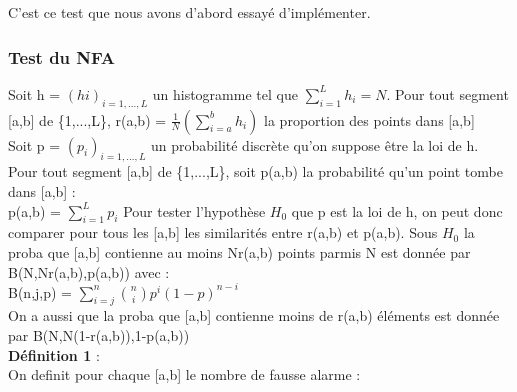 \documentclass{article}
\begin{document}
{C'est ce test que nous avons d'abord essayé d'implémenter. 
\subsubsection{Test du NFA}
Soit h = $ (hi)_{i=1,...,L}$ un histogramme tel que $\sum_{i=1}^{L}h_i = N.$
Pour tout segment [a,b] de \{1,...,L\}, 
r(a,b) = $\frac{1}{N}(\sum_{i=a}^{b}h_i) $ la proportion des points dans [a,b]\\
Soit p = $(p_i)_{i=1,...,L}$ un probabilité discrète qu'on suppose être la loi de h. \\
Pour tout segment [a,b] de \{1,...,L\}, soit p(a,b) la probabilité qu'un point tombe dans [a,b] : \\
p(a,b) = $\sum_{i=1}^{L}p_i $
Pour tester l'hypothèse $H_0$ que p est la loi de h, on peut donc comparer pour tous les [a,b] les similarités entre r(a,b) et p(a,b). 
Sous $H_0$ la proba que [a,b] contienne au moins Nr(a,b) points parmis N est donnée par B(N,Nr(a,b),p(a,b)) avec : \\
B(n,j,p) = $\sum_{i=j}^{n} \binom{n}{i}p^i(1-p)^{n-i}$ \\
On a aussi que la proba que [a,b] contienne moins de r(a,b) éléments est donnée par B(N,N(1-r(a,b)),1-p(a,b))\\
\textbf{Définition 1} :\\
On definit pour chaque [a,b] le nombre de fausse alarme : \\

}
\end{document}
